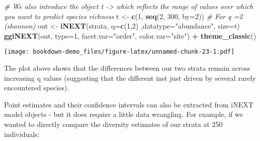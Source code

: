 \documentclass[]{book}
\newenvironment{Shaded}{\begin{snugshade}}{\end{snugshade}}
\newcommand{\KeywordTok}[1]{\textcolor[rgb]{0.13,0.29,0.53}{\textbf{#1}}}
\newcommand{\DataTypeTok}[1]{\textcolor[rgb]{0.13,0.29,0.53}{#1}}
\newcommand{\DecValTok}[1]{\textcolor[rgb]{0.00,0.00,0.81}{#1}}
\newcommand{\StringTok}[1]{\textcolor[rgb]{0.31,0.60,0.02}{#1}}
\newcommand{\CommentTok}[1]{\textcolor[rgb]{0.56,0.35,0.01}{\textit{#1}}}
\newcommand{\OperatorTok}[1]{\textcolor[rgb]{0.81,0.36,0.00}{\textbf{#1}}}
\newcommand{\NormalTok}[1]{#1}
\begin{document}
\begin{Shaded}
\begin{Highlighting}[]
\CommentTok{# We also introduce the object t -> which reflects the range of values over which you want to predict species richness}
\NormalTok{t <-}\StringTok{ }\KeywordTok{c}\NormalTok{(}\DecValTok{1}\NormalTok{, }\KeywordTok{seq}\NormalTok{(}\DecValTok{2}\NormalTok{, }\DecValTok{300}\NormalTok{, }\DataTypeTok{by=}\DecValTok{2}\NormalTok{))}
\CommentTok{# For q =2 (shannon)}
\NormalTok{out <-}\StringTok{ }\KeywordTok{iNEXT}\NormalTok{(strata, }\DataTypeTok{q=}\KeywordTok{c}\NormalTok{(}\DecValTok{1}\NormalTok{,}\DecValTok{2}\NormalTok{) ,}\DataTypeTok{datatype=}\StringTok{"abundance"}\NormalTok{, }\DataTypeTok{size=}\NormalTok{t)}
\KeywordTok{ggiNEXT}\NormalTok{(out, }\DataTypeTok{type=}\DecValTok{1}\NormalTok{, }\DataTypeTok{facet.var=}\StringTok{"order"}\NormalTok{, }\DataTypeTok{color.var=}\StringTok{"site"}\NormalTok{) }\OperatorTok{+}\StringTok{ }\KeywordTok{theme_classic}\NormalTok{() }
\end{Highlighting}
\end{Shaded}

\texttt{[image: bookdown-demo\_files/figure-latex/unnamed-chunk-23-1.pdf]}

The plot above shows that the differences between our two strata remain
across increasing q values (suggesting that the different inst just
driven by several rarely encountered species).

Point estimates and their confidence intervals can also be extracted
from iNEXT model objects - but it does require a little data wrangling.
For example, if we wanted to directly compare the diversity estimates of
our strata at 250 individuals:
\end{document}
